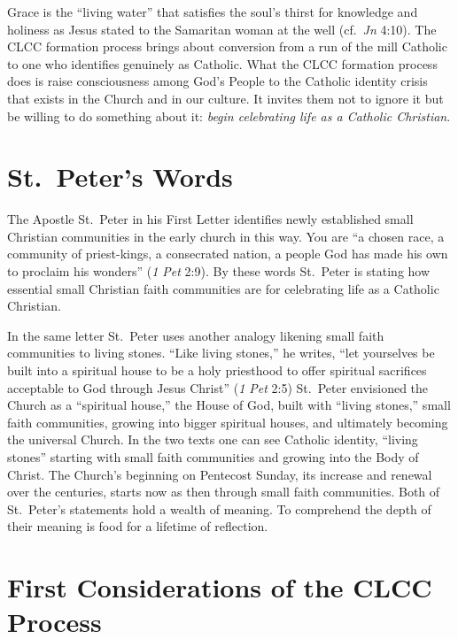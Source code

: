 \documentclass{article}
\begin{document}
Grace is the ``living water'' that satisfies the soul's thirst for knowledge and
holiness as Jesus stated to the Samaritan woman at the well (cf.\ \emph{Jn}
4:10). The CLCC formation process brings about conversion from a run of the mill
Catholic to one who identifies genuinely as Catholic. What the CLCC formation
process does is raise consciousness among God's People to the Catholic identity
crisis that exists in the Church and in our culture. It invites them not to
ignore it but be willing to do something about it: \emph{begin celebrating life
as a Catholic Christian}.

\section{St.\ Peter's Words}

The Apostle St.\ Peter in his First Letter identifies newly established small
Christian communities in the early church in this way. You are ``a chosen race,
a community of priest-kings, a consecrated nation, a people God has made his own
to proclaim his wonders'' (\emph{1 Pet} 2:9). By these words St.\ Peter is
stating how essential small Christian faith communities are for celebrating life
as a Catholic Christian.

In the same letter St.\ Peter uses another analogy likening small faith
communities to living stones. ``Like living stones,'' he writes, ``let
yourselves be built into a spiritual house to be a holy priesthood to offer
spiritual sacrifices acceptable to God through Jesus Christ'' (\emph{1 Pet} 2:5)
St.\ Peter envisioned the Church as a ``spiritual house,'' the House of God,
built with ``living stones,'' small faith communities, growing into bigger
spiritual houses, and ultimately becoming the universal Church. In the two texts
one can see Catholic identity, ``living stones'' starting with small faith
communities and growing into the Body of Christ. The Church's beginning on
Pentecost Sunday, its increase and renewal over the centuries, starts now as
then through small faith communities. Both of St.\ Peter's statements hold a
wealth of meaning. To comprehend the depth of their meaning is food for a
lifetime of reflection.

\section{First Considerations of the CLCC Process}
\end{document}
